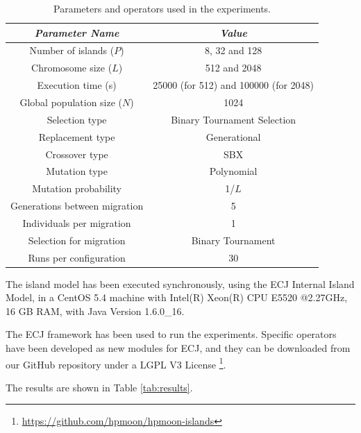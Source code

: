 \documentclass[runningheads,a4paper]{llncs}
\begin{document}
\begin{table}
\begin{center}
\begin{tabular}{|c|c|}
\hline
{\em Parameter Name} & {\em Value} \\ \hline
Number of islands ($P$) & 8, 32 and 128 \\ \hline
Chromosome size ($L$) & 512 and 2048 \\ \hline
Execution time (s) & 25000 (for 512) and 100000 (for 2048) \\ \hline \hline
Global population size ($N$) & 1024 \\ \hline
Selection type & Binary Tournament Selection \\ \hline
Replacement type & Generational \\ \hline %
Crossover type & SBX \\ \hline
Mutation  type & Polynomial\\ \hline
Mutation probability & 1/$L$ \\ \hline
Generations between migration & 5 \\ \hline
Individuals per migration & 1 \\ \hline
Selection for migration & Binary Tournament\\ \hline
Runs per configuration & 30 \\ \hline
\end{tabular}
\caption{Parameters and operators used in the experiments.}
\label{tab:parameters}
\end{center}
\end{table}

The island model has been executed synchronously, using the ECJ Internal Island Model, in a CentOS 5.4 machine with Intel(R) Xeon(R) CPU E5520 @2.27GHz, 16 GB RAM, with Java Version 1.6.0\_16.

The ECJ framework \cite{ECJ} has been used to run the experiments. Specific operators have been developed as new modules for ECJ, and they can be downloaded from our GitHub repository under a LGPL V3 License \footnote{\url{https://github.com/hpmoon/hpmoon-islands}}.

The results are shown in Table \ref{tab:results}.
\end{document}
